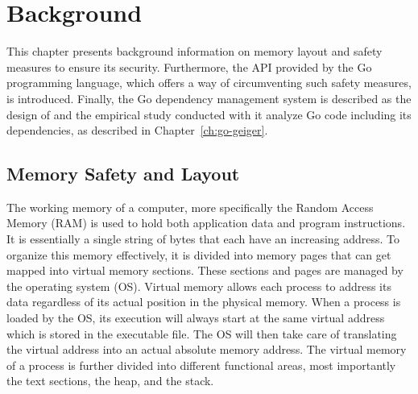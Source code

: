 
\chapter{Background}\label{ch:background}

This chapter presents background information on memory layout and safety measures to ensure its security.
Furthermore, the \unsafe{} \acrshort{API} provided by the Go programming language, which offers a way of circumventing
such safety measures, is introduced.
Finally, the Go dependency management system is described as the design of \toolGeiger{} and the empirical study
conducted with it analyze Go code including its dependencies, as described in Chapter~\ref{ch:go-geiger}.



\section{Memory Safety and Layout}\label{sec:background:memory-safety-layout}

The working memory of a computer, more specifically the Random Access Memory (\acrshort{RAM}) is used to hold both
application data and program instructions.
It is essentially a single string of bytes that each have an increasing address.
To organize this memory effectively, it is divided into memory pages that can get mapped into virtual memory sections.
These sections and pages are managed by the operating system (\acrshort{OS}).
Virtual memory allows each process to address its data regardless of its actual position in the physical memory.
When a process is loaded by the \acrshort{OS}, its execution will always start at the same virtual address which is
stored in the executable file.
The \acrshort{OS} will then take care of translating the virtual address into an actual absolute memory address.
The virtual memory of a process is further divided into different functional areas, most importantly the text sections,
the heap, and the stack.


